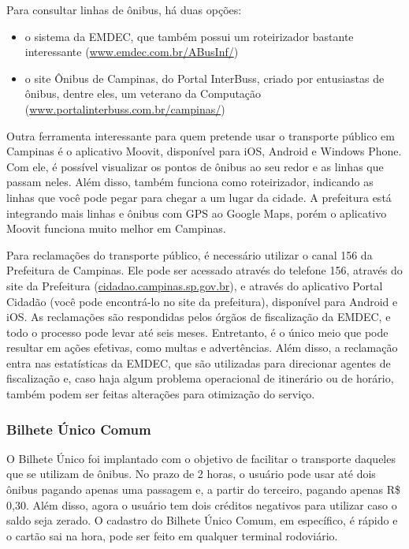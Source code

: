 Para consultar linhas de ônibus, há duas opções:
\begin{itemize}
  \item o sistema da EMDEC, que também possui um roteirizador bastante
        interessante (\url{www.emdec.com.br/ABusInf/})
  \item o site Ônibus de Campinas, do Portal InterBuss, criado por entusiastas
        de ônibus, dentre eles, um veterano da Computação
(\url{www.portalinterbuss.com.br/campinas/})
\end{itemize}

Outra ferramenta interessante para quem pretende usar o transporte público em
Campinas é o aplicativo Moovit, disponível para iOS, Android e Windows
Phone. Com ele, é possível visualizar os pontos de ônibus ao seu redor e as
linhas que passam neles. Além disso, também funciona como roteirizador,
indicando as linhas que você pode pegar para chegar a um lugar da cidade. A
prefeitura está integrando mais linhas e ônibus com GPS ao Google Maps, porém
o aplicativo Moovit funciona muito melhor em Campinas.

Para reclamações do transporte público, é necessário utilizar o canal 156 da
Prefeitura de Campinas. Ele pode ser acessado através do telefone 156, através
do site da Prefeitura (\url{cidadao.campinas.sp.gov.br}), e através do
aplicativo Portal Cidadão (você pode encontrá-lo no site da prefeitura),
disponível para Android e iOS. As reclamações são respondidas pelos órgãos de
fiscalização da EMDEC, e todo o processo pode levar até seis meses. Entretanto,
é o único meio que pode resultar em ações efetivas, como multas e advertências.
Além disso, a reclamação entra nas estatísticas da EMDEC, que são utilizadas
para direcionar agentes de fiscalização e, caso haja algum problema operacional
de itinerário ou de horário, também podem ser feitas alterações para otimização
do serviço.

\subsubsection{Bilhete Único Comum}

O Bilhete Único foi implantado com o objetivo de facilitar o transporte
daqueles que se utilizam de ônibus. No prazo de 2 horas, o usuário pode usar
até dois ônibus pagando apenas uma passagem e, a partir do terceiro, pagando
apenas R\$ 0,30. Além disso, agora o usuário tem dois créditos negativos para
utilizar caso o saldo seja zerado. O cadastro do Bilhete Único Comum, em
específico, é rápido e o cartão sai na hora, pode ser feito em qualquer
terminal rodoviário.

